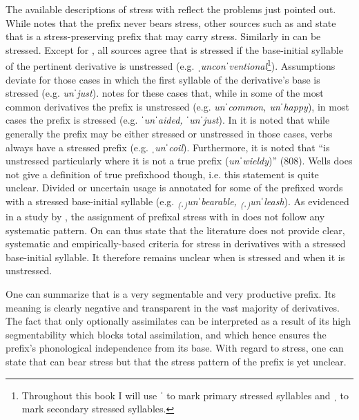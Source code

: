 The available descriptions of stress with  reflect the problems just pointed out. While \citet[4]{Allen.1978} notes that the prefix never bears stress, other sources such as \citet[464 f]{Jespersen.1965} and \citet[126]{Okada.2013} state that  is a stress-preserving prefix that may carry stress. Similarly in \cite{Wells.2008}  can be stressed. Except for \cite{Allen.1978}, all sources agree that  is stressed if the base-initial syllable of the pertinent derivative is unstressed (e.g. \textit{ˌunconˈventional}\footnote{Throughout this book I will use ˈ to mark primary stressed syllables and ˌ to mark secondary stressed syllables.}).
Assumptions deviate for those cases in which the first syllable of the derivative's base is stressed (e.g. \textit{unˈjust}). \citet[464 f]{Jespersen.1965} notes for these cases that, while in some of the most common derivatives the prefix is unstressed (e.g. \textit{unˈcommon, unˈhappy}), in most cases the prefix is stressed (e.g. \textit{ˈunˈaided, ˈunˈjust}). 
In \citet[808]{Wells.2008} it is noted that while generally the prefix may be either stressed or unstressed in those cases, verbs always have a stressed prefix (e.g. \textit{ˌunˈcoil}). Furthermore, it is noted that  ``is unstressed particularly where it is not a true prefix (\textit{unˈwieldy})'' (808). Wells does not give a definition of true prefixhood though, i.e. this statement is quite unclear. Divided or uncertain usage is annotated for some of the prefixed words with a stressed base-initial syllable (e.g. \textit{\textsubscript{(}ˌ\textsubscript{)}unˈbearable, \textsubscript{(}ˌ\textsubscript{)}unˈleash}). As evidenced in a study by \citet[2 ff]{Hanote.2010}, the assignment of prefixal stress with  in \cite{Wells.2008} does not follow any systematic pattern.
On can thus state that the literature does not provide clear, systematic and empirically-based criteria for stress in derivatives with a stressed base-initial syllable. It therefore remains unclear when  is stressed and when it is unstressed. 


One can summarize that  is a very segmentable and very productive prefix. Its meaning is clearly negative and transparent in the vast majority of derivatives. The fact that  only optionally assimilates can be interpreted as a result of its high segmentability which blocks total assimilation, and  which hence ensures the prefix's phonological independence from its base. With regard to stress, one can state that  can bear stress but that the stress pattern of the prefix is yet unclear.



